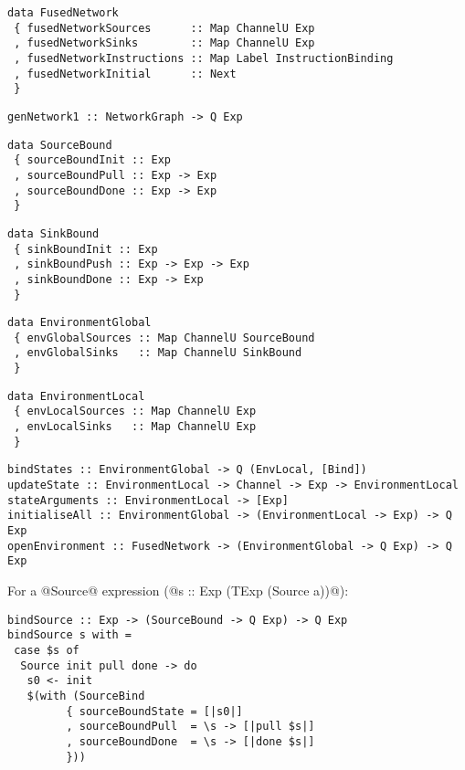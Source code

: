 \begin{lstlisting}
data FusedNetwork
 { fusedNetworkSources      :: Map ChannelU Exp
 , fusedNetworkSinks        :: Map ChannelU Exp
 , fusedNetworkInstructions :: Map Label InstructionBinding
 , fusedNetworkInitial      :: Next
 }
\end{lstlisting}

\begin{lstlisting}
genNetwork1 :: NetworkGraph -> Q Exp
\end{lstlisting}


\begin{lstlisting}
data SourceBound
 { sourceBoundInit :: Exp
 , sourceBoundPull :: Exp -> Exp
 , sourceBoundDone :: Exp -> Exp
 }
\end{lstlisting}

\begin{lstlisting}
data SinkBound
 { sinkBoundInit :: Exp
 , sinkBoundPush :: Exp -> Exp -> Exp
 , sinkBoundDone :: Exp -> Exp
 }
\end{lstlisting}

\begin{lstlisting}
data EnvironmentGlobal
 { envGlobalSources :: Map ChannelU SourceBound
 , envGlobalSinks   :: Map ChannelU SinkBound
 }
\end{lstlisting}

\begin{lstlisting}
data EnvironmentLocal
 { envLocalSources :: Map ChannelU Exp
 , envLocalSinks   :: Map ChannelU Exp
 }
\end{lstlisting}

\begin{lstlisting}
bindStates :: EnvironmentGlobal -> Q (EnvLocal, [Bind])
updateState :: EnvironmentLocal -> Channel -> Exp -> EnvironmentLocal
stateArguments :: EnvironmentLocal -> [Exp]
initialiseAll :: EnvironmentGlobal -> (EnvironmentLocal -> Exp) -> Q Exp
openEnvironment :: FusedNetwork -> (EnvironmentGlobal -> Q Exp) -> Q Exp
\end{lstlisting}



For a @Source@ expression (@s :: Exp (TExp (Source a))@):
\begin{lstlisting}
bindSource :: Exp -> (SourceBound -> Q Exp) -> Q Exp
bindSource s with =
 case $s of
  Source init pull done -> do
   s0 <- init
   $(with (SourceBind
         { sourceBoundState = [|s0|]
         , sourceBoundPull  = \s -> [|pull $s|]
         , sourceBoundDone  = \s -> [|done $s|]
         }))
\end{lstlisting}

